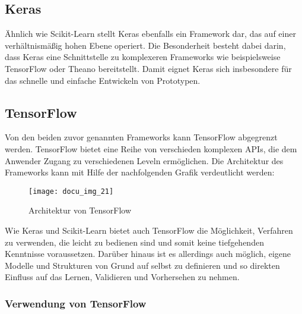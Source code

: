 \subsection{Keras}

Ähnlich wie Scikit-Learn stellt Keras ebenfalls ein Framework dar, das auf einer verhältnismäßig hohen Ebene operiert.
Die Besonderheit besteht dabei darin, dass Keras eine Schnittstelle zu komplexeren Frameworks wie beispielsweise
TensorFlow oder Theano bereitstellt. Damit eignet Keras sich insbesondere für das schnelle und einfache Entwickeln von
Prototypen.

\subsection{TensorFlow}

Von den beiden zuvor genannten Frameworks kann TensorFlow abgegrenzt werden. TensorFlow bietet eine Reihe von
verschieden komplexen APIs, die dem Anwender Zugang zu verschiedenen Leveln ermöglichen. Die Architektur des Frameworks
kann mit Hilfe der nachfolgenden Grafik verdeutlicht werden:

\begin{figure}[H]
    \centering
    \texttt{[image: docu\_img\_21]}
    \caption{Architektur von TensorFlow}
    \label{fig:tf-api}
\end{figure}

Wie Keras und Scikit-Learn bietet auch TensorFlow die Möglichkeit, Verfahren zu verwenden, die leicht zu bedienen sind
und somit keine tiefgehenden Kenntnisse voraussetzen. Darüber hinaus ist es allerdings auch möglich, eigene Modelle und
Strukturen von Grund auf selbst zu definieren und so direkten Einfluss auf das Lernen, Validieren und Vorhersehen zu
nehmen.

\subsubsection{Verwendung von TensorFlow}

